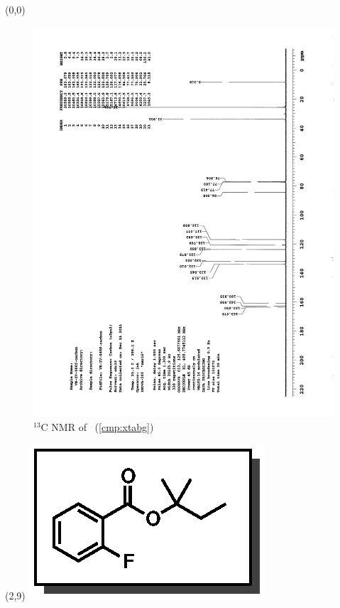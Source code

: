 \clearpage
\begin{textblock}{20}(0,0)
\begin{figure}[htb]
\caption{$^{13}$C NMR of  \CMPxtabg\ (\ref{cmp:xtabg})}
\includegraphics[scale=0.75, trim = 0mm 0mm 0mm 5mm,
clip]{chp_asymmetric/images/nmr/xtabgC}
\vspace{-100pt}
\end{figure}
\end{textblock}
\begin{textblock}{1}(2,9)
\includegraphics[scale=0.8, angle=90]{chp_asymmetric/images/xtabg}
\end{textblock}
